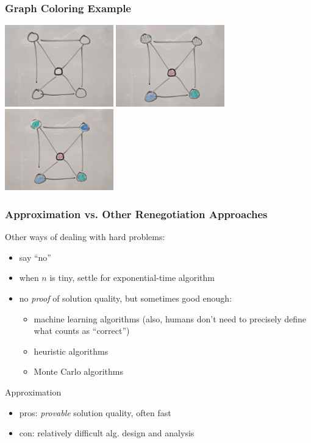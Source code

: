\documentclass[10pt,aspectratio=169]{beamer}
\begin{document}
  \begin{frame} \frametitle{Graph Coloring Example}
    \begin{center}
      \includegraphics[height=100pt]{13-graph-uncolored.jpg}
      \includegraphics[height=100pt]{13-graph-colored-suboptimal.jpg}
      \includegraphics[height=100pt]{13-graph-colored-optimal.jpg}
    \end{center}
  \end{frame}
  
  \begin{frame} \frametitle{Approximation vs. Other Renegotiation Approaches}
  Other ways of dealing with hard problems:
  \begin{itemize}
    \item say ``no''
    \item when $n$ is tiny, settle for exponential-time algorithm
    \item no \emph{proof} of solution quality, but sometimes good enough:
      \begin{itemize}
        \item machine learning algorithms (also, humans don't need to precisely define what counts as ``correct'')
        \item heuristic algorithms
        \item Monte Carlo algorithms
      \end{itemize}
  \end{itemize}
  
  Approximation
  \begin{itemize}
    \item pros: \emph{provable} solution quality, often fast
    \item con: relatively difficult alg. design and analysis
  \end{itemize}
  \end{frame}
  
\end{document}
